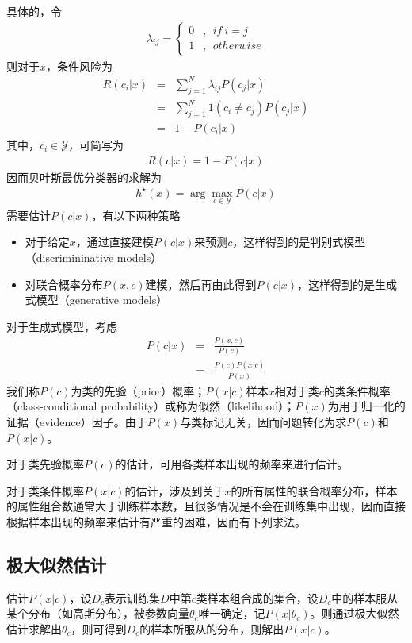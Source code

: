 具体的，令
\begin{eqnarray}
\lambda_{ij}=
\left\lbrace
\begin{aligned}
0 &,\ \ if\ i=j\\
1 &,\ \ otherwise
\end{aligned}
\right.
\end{eqnarray}
则对于$x$，条件风险为
\begin{eqnarray}
R(c_i|x) &=& \sum_{j=1}^N\lambda_{ij}P(c_j|x)\\
&=& \sum_{j=1}^N 1(c_i\neq c_j)P(c_j|x)\\
&=& 1-P(c_i|x)
\end{eqnarray}
其中，$c_i\in \mathcal{Y}$，可简写为
\begin{eqnarray}
R(c|x)=1-P(c|x)
\end{eqnarray}
因而贝叶斯最优分类器的求解为
\begin{eqnarray}
h^\star(x)=\arg\max_{c\in\mathcal{Y}}P(c|x)
\end{eqnarray}
需要估计$P(c|x)$，有以下两种策略
\begin{itemize}
\item 对于给定$x$，通过直接建模$P(c|x)$来预测$c$，这样得到的是判别式模型（discrimininative models）
\item 对联合概率分布$P(x,c)$建模，然后再由此得到$P(c|x)$，这样得到的是生成式模型（generative models）
\end{itemize}
对于生成式模型，考虑
\begin{eqnarray}
P(c|x) &=& \frac{P(x,c)}{P(c)}\\
&=& \frac{P(c)P(x|c)}{P(x)}
\end{eqnarray}
我们称$P(c)$为类的先验（prior）概率；$P(x|c)$样本$x$相对于类$c$的类条件概率（class-conditional probability）或称为似然（likelihood）；$P(x)$为用于归一化的证据（evidence）因子。由于$P(x)$与类标记无关，因而问题转化为求$P(c)$和$P(x|c)$。

对于类先验概率$P(c)$的估计，可用各类样本出现的频率来进行估计。

对于类条件概率$P(x|c)$的估计，涉及到关于$x$的所有属性的联合概率分布，样本的属性组合数通常大于训练样本数，且很多情况是不会在训练集中出现，因而直接根据样本出现的频率来估计有严重的困难，因而有下列求法。

\subsection{极大似然估计}
估计$P(x|c)$，设$D_c$表示训练集$D$中第$c$类样本组合成的集合，设$D_c$中的样本服从某个分布（如高斯分布），被参数向量$\theta_c$唯一确定，记$P(x|\theta_c)$。则通过极大似然估计求解出$\theta_c$，则可得到$D_c$的样本所服从的分布，则解出$P(x|c)$。


